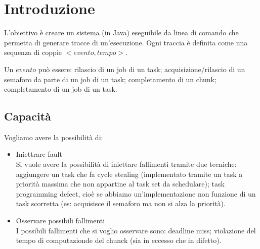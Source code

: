 \chapter{Introduzione}
L'obiettivo è creare un sistema (in Java) eseguibile da linea di comando che permetta di generare tracce di un'esecuzione. Ogni traccia è definita come una sequenza di coppie $<evento,tempo>$.

Un $evento$ può essere: rilascio di un job di un task; acquisizione/rilascio di un semaforo da parte di un job di un task; completamento di un chunk; completamento di un job di un task.

\section{Capacità}
Vogliamo avere la possibilità di:
\begin{itemize}
    \item Iniettrare fault \\
        Si vuole avere la possibilità di iniettare fallimenti tramite due tecniche: aggiungere un task che fa cycle stealing (implementato tramite un task a priorità massima che non appartine al task set da schedulare); task programming defect, cioè se abbiamo un'implementazione non funzione di un task scorretta (es: acquisisce il semaforo ma non si alza la priorità).
    \item Osservare possibili fallimenti \\
        I possibili fallimenti che si voglio osservare sono: deadline miss; violazione del tempo di computazionde del chunck (sia in eccesso che in difetto).
\end{itemize}